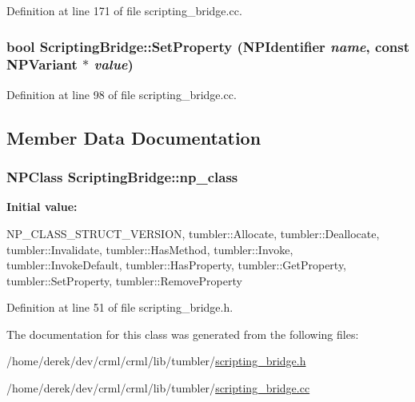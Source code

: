 Definition at line 171 of file scripting\_\-bridge.cc.

\hypertarget{classtumbler_1_1_scripting_bridge_ae73ff0ec0f70dfcd0e22534c8281f3e3}{
\subsubsection[{SetProperty}]{\setlength{\rightskip}{0pt plus 5cm}bool ScriptingBridge::SetProperty (NPIdentifier {\em name}, \/  const NPVariant $\ast$ {\em value})}}
\label{classtumbler_1_1_scripting_bridge_ae73ff0ec0f70dfcd0e22534c8281f3e3}


Definition at line 98 of file scripting\_\-bridge.cc.



\subsection{Member Data Documentation}
\hypertarget{classtumbler_1_1_scripting_bridge_a4fcbbbaf7a6d91a2766066fa2cb2236b}{
\subsubsection[{np\_\-class}]{\setlength{\rightskip}{0pt plus 5cm}NPClass {\bf ScriptingBridge::np\_\-class}}}
\label{classtumbler_1_1_scripting_bridge_a4fcbbbaf7a6d91a2766066fa2cb2236b}
{\bfseries Initial value:}
\begin{DoxyCode}
 {
  NP_CLASS_STRUCT_VERSION,
  tumbler::Allocate,
  tumbler::Deallocate,
  tumbler::Invalidate,
  tumbler::HasMethod,
  tumbler::Invoke,
  tumbler::InvokeDefault,
  tumbler::HasProperty,
  tumbler::GetProperty,
  tumbler::SetProperty,
  tumbler::RemoveProperty
}
\end{DoxyCode}


Definition at line 51 of file scripting\_\-bridge.h.



The documentation for this class was generated from the following files:\begin{DoxyCompactItemize}
\item 
/home/derek/dev/crml/crml/lib/tumbler/\hyperlink{lib_2tumbler_2scripting__bridge_8h}{scripting\_\-bridge.h}\item 
/home/derek/dev/crml/crml/lib/tumbler/\hyperlink{lib_2tumbler_2scripting__bridge_8cc}{scripting\_\-bridge.cc}\end{DoxyCompactItemize}

